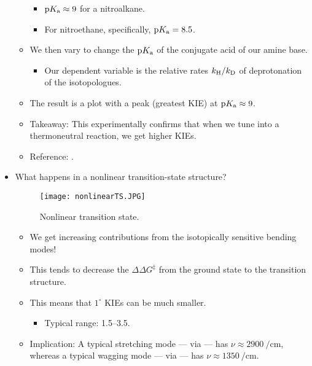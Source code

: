 \documentclass[../notes.tex]{subfiles}
\begin{document}
\begin{itemize}
\begin{itemize}
\begin{center}
            \schemestop
        \end{center}
        \begin{itemize}
            \item $\textup{p}K_\textup{a}\approx 9$ for a nitroalkane.
            \item For nitroethane, specifically, $\textup{p}K_\textup{a}=8.5$.
        \end{itemize}
        \item We then vary  to change the $\textup{p}K_\textup{a}$ of the conjugate acid of our amine base.
        \begin{itemize}
            \item Our dependent variable is the relative rates $k_{\ce{H}}/k_{\ce{D}}$ of deprotonation of the isotopologues.
        \end{itemize}
        \item The result is a plot with a peak (greatest KIE) at $\textup{p}K_\textup{a}\approx 9$.
        \item Takeaway: This experimentally confirms that when we tune into a thermoneutral reaction, we get higher KIEs.
        \item Reference: \textcite{bib:KIEasyVary}.
    \end{itemize}
    \item What happens in a nonlinear transition-state structure?
    \begin{figure}[h!]
        \centering
        \texttt{[image: nonlinearTS.JPG]}
        \caption{Nonlinear transition state.}
        \label{fig:nonlinearTS}
    \end{figure}
    \begin{itemize}
        \item We get increasing contributions from the isotopically sensitive bending modes!
        \item This tends to decrease the $\Delta\Delta G^\ddagger$ from the ground state to the transition structure.
        \item This means that $1^\circ$ KIEs can be much smaller.
        \begin{itemize}
            \item Typical range: \numrange{1.5}{3.5}.
        \end{itemize}
        \item Implication: A typical  stretching mode --- via  --- has $\nu\approx\SI{2900}{\per\centi\meter}$, whereas a typical  wagging mode --- via  --- has $\nu\approx\SI{1350}{\per\centi\meter}$.

\end{itemize}
\end{itemize}
\end{document}
